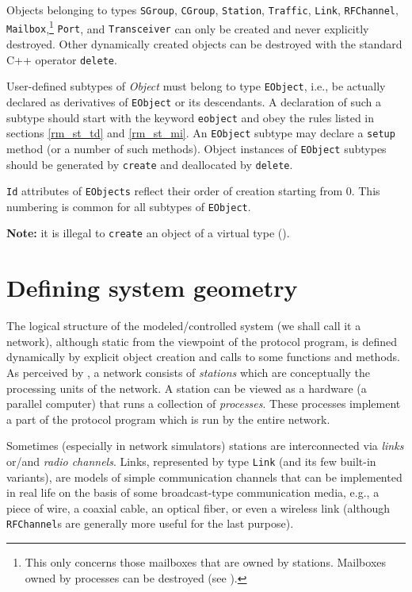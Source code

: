 Objects belonging to types {\tt SGroup}, {\tt CGroup}, {\tt Station},
{\tt Traffic}, {\tt Link}, {\tt RFChannel}, {\tt Mailbox},\footnote{This only
concerns those mailboxes that are owned by stations.
Mailboxes owned by processes can be destroyed (see ).}
{\tt Port}, and
{\tt Transceiver} can only be created and never explicitly destroyed.
Other dynamically created
objects can be destroyed with the standard C++ operator {\tt delete}.

User-defined subtypes of {\em Object\/} must belong to type {\tt EObject}, i.e.,
be actually declared as derivatives of {\tt EObject} or its descendants.
A declaration of such a subtype should start with the keyword {\tt eobject}
and obey the rules listed in sections \ref{rm_st_td} and \ref{rm_st_mi}.
An {\tt EObject} subtype
may declare a {\tt setup} method (or a number of such methods).
Object instances of {\tt EObject} subtypes should be generated
by {\tt create} and deallocated by {\tt delete}.

{\tt Id} attributes of {\tt EObjects} reflect their order of
creation starting from 0.
This numbering is common for all subtypes of {\tt EObject}.

\medskip

\noindent
{\bf Note:} it is illegal to {\tt create} an object of a virtual type
().

\section{Defining system geometry}
\label{rm_to}

The logical structure of the modeled/controlled
system (we shall call it a network), although static from the viewpoint
of the protocol program, is defined dynamically by explicit object creation
and calls to some functions and methods.
As perceived by \smurph, a network consists of {\em stations\/} which are
conceptually the processing units of the network.
A station can be viewed as a hardware
(a parallel computer) that runs a collection of {\em processes}.
These processes implement a part of the protocol program which is run by
the entire network.

Sometimes (especially in network simulators) stations
are interconnected via {\em links\/} or/and {\em radio channels}.
Links, represented by type {\tt Link} (and its few built-in variants),
are models of
simple communication channels that can be implemented in real life
on the basis of some broadcast-type communication media, e.g.,
a piece of wire, a coaxial cable, an optical fiber, or even a wireless link
(although {\tt RFChannel}s are generally more useful for the last purpose).

